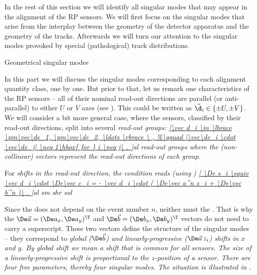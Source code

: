 In the rest of this section we will identify all singular modes that may appear in the alignment of the RP sensors. We will first focus on the singular modes that arise from the interplay between the geometry of the detector apparatus and the geometry of the tracks. Afterwards we will turn our attention to the singular modes provoked by special (pathological) track distributions.

\caption{Geometrical singular modes}

In this part we will discuss the singular modes corresponding to each alignment quantity class, one by one. But prior to that, let us remark one characteristics of the RP sensors -- all of their nominal read-out directions are parallel (or anti-parallel) to either $U$ or $V$ axes (see ). This could be written as $\vec\d_i \in \{\pm U, \pm V\}$. We will consider a bit more general case, where the sensors, classified by their read-out directions, split into several \em{read-out groups}:
\eqref{\vec d_i \in \lbrace \pm\vec\de_1, \pm\vec\de_2, \ldots \rbrace \ ,
}{al read-out groups}
where the (non-collinear) vectors represent the read-out directions of each group. 

For \em{shifts in the read-out direction}, the condition  reads (using )
\eqref{
	\De s_i \equiv
	\vec d_i \cdot \De\vec c_i =
	- \vec d_i \cdot ( \De\vec a^n z_i + \De\vec b^n )\ .
}{al sm shr sol}

Since the \lhs{} does not depend on the event number $n$, neither must the \rhs{}. That is why the ${\De\vec a}=(\De a_x, \De a_y)^\T$ and ${\De\vec b=(\De b_x, \De b_y)^\T}$ vectors do not need to carry a superscript. These two vectors define the structure of the singular modes -- they correspond to \em{global} ($\De\vec b$) and \em{linearly-progressive} ($\De\vec a\, z_i$) shifts in $x$ and $y$. By global shift we mean a shift that is common for all sensors. The size of a linearly-progressive shift is proportional to the $z$-position of a sensor. There are four free parameters, thereby four singular modes. The situation is illustrated in .


